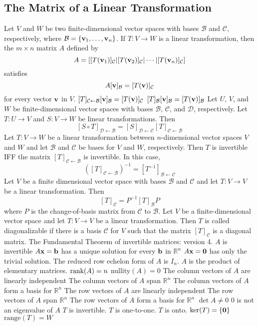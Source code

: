 \documentclass{article}
\begin{document}
        \subsection{The Matrix of a Linear Transformation}
        \begin{outline}
            \1 Let $V$ and $W$ be two finite-dimensional vector spaces with bases \(\mathcal B\) and \(\mathcal C\), respectively, where \(\mathcal B=\{\vb v_1,\ldots,\vb v_n\}\). If \(T:V\to W\) is a linear transformation, then the \(m\times n\) matrix $A$ defined by \[A=[[T(\vb v_1)]_\mathcal C|[T(\vb v_2)]_\mathcal C|\cdots|[T(\vb v_n)]_\mathcal C]\] satisfies \[A[\vb v]_\mathcal B=[T(\vb v)]_\mathcal C\] for every vector \(\vb v\) in $V$. 
            \1 \([T]_{\mathcal C\leftarrow\mathcal B}[\vb v]_\mathcal B=[T(\vb v)]_\mathcal C\)
            \1 \([T]_\mathcal B[\vb v]_\mathcal B=[T(\vb v)]_\mathcal B\)
            \1 Let $U$, $V$, and $W$ be finite-dimensional vector spaces with bases \(\mathcal B\), \(\mathcal C\), and \(\mathcal D\), respectively. Let \(T:U\to V\) and \(S:V\to W\) be linear transformations. Then \[[S\circ T]_{\mathcal D\leftarrow\mathcal B}=[S]_{\mathcal D\leftarrow\mathcal C}[T]_{\mathcal C\leftarrow\mathcal B}\]
            \1 Let \(T:V\to W\) be a linear transformation between $n$-dimensional vector spaces $V$ and $W$ and let \(\mathcal B\) and \(\mathcal C\) be bases for $V$ and $W$, respectively. Then $T$ is invertible IFF the matrix \([T]_{\mathcal C\leftarrow\mathcal B}\) is invertible. In this case, \[([T]_{\mathcal C\leftarrow\mathcal B})^{-1}=[T^{-1}]_{\mathcal B\leftarrow\mathcal C}\]
            \1 Let $V$ be a finite dimensional vector space with bases \(\mathcal B\) and \(\mathcal C\) and let \(T:V\to V\) be a linear transformation. Then \[[T]_\mathcal C=P^{-1}[T]_\mathcal BP\] where $P$ is the change-of-basis matrix from \(\mathcal C\) to \(\mathcal B\). 
            \1 Let $V$ be a finite-dimensional vector space and let \(T:V\to V\) be a linear transformation. Then $T$ is called diagonalizable if there is a basis \(\mathcal C\) for $V$ such that the matrix \([T]_\mathcal C\) is a diagonal matrix. 
            \1 The Fundamental Theorem of invertible matrices: version 4. 
                \2 $A$ is invertible
                \2 $A\vb x=\vb b$ has a unique solution for every \(\vb b\) in \(\mathbb R^n\)
                \2 \(A\vb x=\vb 0\) has only the trivial solution. 
                \2 The reduced row echelon form of $A$ is \(I_n\). 
                \2 $A$ is the product of elementary matrices. 
                \2 \(\rank (A)=n\)
                \2 nullity\((A)=0\)
                \2 The column vectors of $A$ are linearly independent
                \2 The column vectors of $A$ span \(\mathbb R^n\)
                \2 The column vectors of $A$ form a basis for \(\mathbb R^n\)
                \2 The row vectors of $A$ are linearly independent
                \2 The row vectors of $A$ span \(\mathbb R^n\)
                \2 The row vectors of $A$ form a basis for \(\mathbb R^n\)
                \2 \(\det A\neq 0\)
                \2 $0$ is not an eigenvalue of $A$
                \2 $T$ is invertible. 
                \2 $T$ is one-to-one. 
                \2 $T$ is onto. 
                \2 \(\text{ker}(T)=\{\vb 0\}\)
                \2 \(\text{range}(T)=W\)
        \end{outline}
\end{document}
